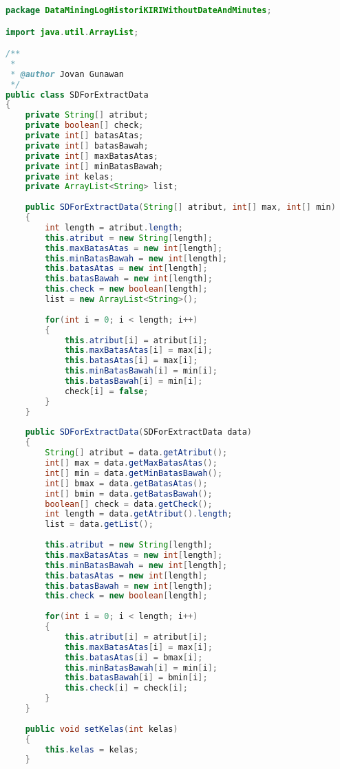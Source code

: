 \begin{lstlisting}[language=Java,basicstyle=\tiny,caption=SDForExtractData.java]
package DataMiningLogHistoriKIRIWithoutDateAndMinutes;

import java.util.ArrayList;

/**
 *
 * @author Jovan Gunawan
 */
public class SDForExtractData 
{
    private String[] atribut;
    private boolean[] check;
    private int[] batasAtas;
    private int[] batasBawah;
    private int[] maxBatasAtas;
    private int[] minBatasBawah;
    private int kelas;
    private ArrayList<String> list;
    
    public SDForExtractData(String[] atribut, int[] max, int[] min)
    {
        int length = atribut.length;
        this.atribut = new String[length];
        this.maxBatasAtas = new int[length];
        this.minBatasBawah = new int[length];
        this.batasAtas = new int[length];
        this.batasBawah = new int[length];
        this.check = new boolean[length];
        list = new ArrayList<String>();
        
        for(int i = 0; i < length; i++)
        {
            this.atribut[i] = atribut[i];
            this.maxBatasAtas[i] = max[i];
            this.batasAtas[i] = max[i];
            this.minBatasBawah[i] = min[i];
            this.batasBawah[i] = min[i];
            check[i] = false;
        }
    }
    
    public SDForExtractData(SDForExtractData data)
    {
        String[] atribut = data.getAtribut();
        int[] max = data.getMaxBatasAtas();
        int[] min = data.getMinBatasBawah();
        int[] bmax = data.getBatasAtas();
        int[] bmin = data.getBatasBawah();
        boolean[] check = data.getCheck();
        int length = data.getAtribut().length;
        list = data.getList();
        
        this.atribut = new String[length];
        this.maxBatasAtas = new int[length];
        this.minBatasBawah = new int[length];
        this.batasAtas = new int[length];
        this.batasBawah = new int[length];
        this.check = new boolean[length];
        
        for(int i = 0; i < length; i++)
        {
            this.atribut[i] = atribut[i];
            this.maxBatasAtas[i] = max[i];
            this.batasAtas[i] = bmax[i];
            this.minBatasBawah[i] = min[i];
            this.batasBawah[i] = bmin[i];
            this.check[i] = check[i];
        }
    }
    
    public void setKelas(int kelas)
    {
        this.kelas = kelas;
    }
    

\end{lstlisting}
